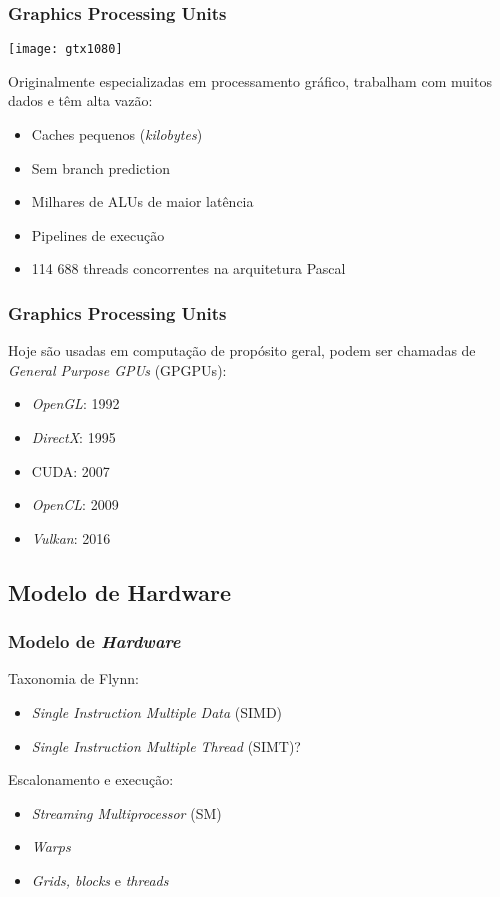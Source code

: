 \documentclass[10pt, compress, aspectratio=43, xcolor={table,usenames,dvipsnames}]{beamer}
\begin{document}
\begin{frame}
    \frametitle{Graphics Processing Units}
    \begin{center}
        \texttt{[image: gtx1080]}
    \end{center}

    Originalmente especializadas em \alert{processamento gráfico},
    trabalham com muitos dados e têm \alert{alta vazão}:

    \begin{itemize}
        \item Caches pequenos (\textit{kilobytes})
        \item Sem \alert{branch prediction}
        \item \alert{Milhares} de ALUs de \alert{maior latência}
        \item \alert{Pipelines} de execução
        \item 114 688 \alert{threads} concorrentes na arquitetura Pascal
    \end{itemize}
\end{frame}

\begin{frame}
    \frametitle{Graphics Processing Units}
    Hoje são usadas em computação de propósito geral, podem ser chamadas de
    \textit{General Purpose GPUs} (GPGPUs):
    \begin{itemize}
        \item \textit{OpenGL}: 1992
        \item \textit{DirectX}: 1995
        \item \alert{CUDA}: 2007
        \item \textit{OpenCL}: 2009
        \item \textit{Vulkan}: 2016
    \end{itemize}
\end{frame}

\subsection{Modelo de Hardware}

\begin{frame}
    \frametitle{Modelo de \textit{Hardware}}
    Taxonomia de Flynn:
    \begin{itemize}
        \item \textit{Single Instruction Multiple Data} (SIMD)
        \item \textit{Single Instruction Multiple Thread} (SIMT)?
    \end{itemize}
    Escalonamento e execução:
    \begin{itemize}
        \item \textit{Streaming Multiprocessor} (SM)
        \item \textit{Warps}
        \item \textit{Grids, blocks} e \textit{threads}
    \end{itemize}
\end{frame}
\end{document}
